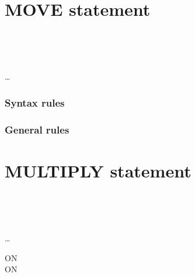 \section{MOVE statement}

\begin{syntax}
  \begin{0-1}
     \\
  \end{0-1}
  \begin{1=}
    \identifier \\
    \literal
  \end{1=}
  \begin{1=}
    \identifier
  \end{1=} \ldots
\end{syntax}

\subsubsection{Syntax rules}

\subsubsection{General rules}

\section{MULTIPLY statement}

\begin{syntax}
  \begin{1=}
    \identifier \\
    \literal
  \end{1=}
  \begin{1=}
    \begin{1=}
      \identifier \\
      \literal
    \end{1=}
    \begin{0-1}
    \end{0-1}
  \end{1=} \ldots

  \begin{0+}
    ON   \imperativestatement \\
     ON   \imperativestatement
  \end{0+}

  \begin{0-1}
  \end{0-1}
\end{syntax}

